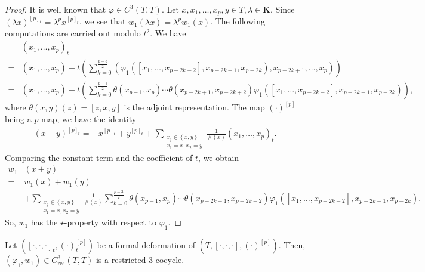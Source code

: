 \documentclass[11pt, twoside]{article}
\begin{document}
\begin{proof}
   It is well known that $\varphi\in C^3(T,T)$. Let $x,x_1,\ldots,x_p,y\in T,\lambda\in \mathbf{K} $.
Since $(\lambda x)^{[p]_t}= \lambda^px^{[p]_t} $, we see that $w_1(\lambda x)=\lambda^pw_1(x) $. The following computations are carried out modulo $t^2 $.
We have \begin{align*}
    &(x_1,\ldots,x_p)_t\\=& (x_1,\ldots,x_p)+ t\left(\sum\limits_{k=0}^\frac{p-3}{2}(\varphi_1([x_1,\ldots,x_{p-2k-2}],x_{p-2k-1},x_{p-2k}),x_{p-2k+1},\ldots,x_p)\right)\\ =& (x_1,\ldots,x_p) + t \left(\sum\limits_{k=0}^{\frac{p-3}{2}}\theta(x_{p-1},x_p)\cdots\theta(x_{p-2k+1},x_{p-2k+2}) \varphi_1([x_1,\ldots,x_{p-2k-2}],x_{p-2k-1},x_{p-2k}) \right),
\end{align*} where $\theta(x,y)(z)=[z,x,y] $ is the adjoint representation. The map $(\cdot)^{[p]}$ being a $p$-map, we have the identity \begin{align*}
    (x+y)^{[p]_t}=& x^{[p]_t}+y^{[p]_t}+  \sum_{\substack{x_j\in \left\{x,y \right\}\\x_1=x,x_2=y}}\frac{1}{\#(x)}(x_1,\ldots,x_p)_t. 
\end{align*} Comparing the constant term and the coefficient of $t$, we obtain \begin{align*}
    w_1&(x+y)\\ =&w_1(x)+w_1(y)\\ & + \sum_{\substack{x_j\in \left\{x,y \right\}\\x_1=x,x_2=y}}\frac{1}{\#(x)}\sum\limits_{k=0}^{\frac{p-3}{2}}\theta(x_{p-1},x_p)\cdots\theta(x_{p-2k+1},x_{p-2k+2}) \varphi_1([x_1,\ldots,x_{p-2k-2}],x_{p-2k-1},x_{p-2k}).
\end{align*} So, $w_1$ has the $\star$-property with respect to $\varphi_1$.
\end{proof}

\begin{prop}
    Let $([\cdot,\cdot,\cdot]_t,(\cdot)^{[p]}_t) $ be a formal deformation of $(T,[\cdot,\cdot,\cdot],(\cdot)^{[p]}) $. Then, $(\varphi_1,w_1)\in C^3_\mathrm{res}(T,T) $ is a restricted $3$-cocycle.
\end{prop}
\end{document}
